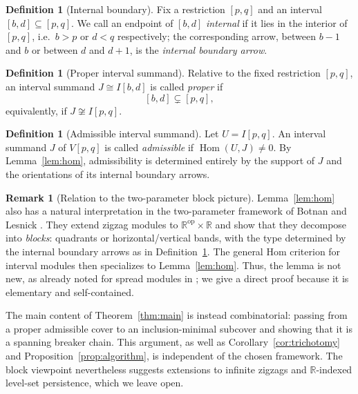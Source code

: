\documentclass[11pt]{amsart}
\numberwithin{equation}{section}
\theoremstyle{definition}
\newtheorem{definition}[theorem]{Definition}
\newtheorem{remark}[theorem]{Remark}
\begin{document}
\begin{definition}[Internal boundary]\label{def:internal}
Fix a restriction $[p,q]$ and an interval $[b,d] \subseteq [p,q]$. We call an
endpoint of $[b,d]$ \emph{internal} if it lies in the interior of $[p,q]$, i.e.\
$b > p$ or $d < q$ respectively; the corresponding arrow, between $b-1$ and $b$
or between $d$ and $d+1$, is the \emph{internal boundary arrow}.\end{definition}


\begin{definition}[Proper interval summand]\label{def:proper}
Relative to the fixed restriction $[p,q]$, an interval summand
$J\cong I[b,d]$ is called \emph{proper} if
\[
[b,d]\subsetneq[p,q],
\]
equivalently, if $J\not\cong I[p,q]$.
\end{definition}


\begin{definition}[Admissible interval summand]\label{def:admissible}
Let  $U=I[p,q]$.  An interval summand $J$ of $V[p,q]$ is called
\emph{admissible} if
\(
\operatorname{Hom}(U,J)\ne0.
\)
By Lemma~\ref{lem:hom}, admissibility is determined entirely by the support
of $J$ and the orientations of its internal boundary arrows.
\end{definition}
\begin{remark}[Relation to the two-parameter block picture]\label{rem:blocks}
Lemma~\ref{lem:hom} also has a natural interpretation in the two-parameter
framework of Botnan and Lesnick \cite{BotnanLesnick}. They extend zigzag
modules to $\mathbb{R}^{\mathrm{op}}\times\mathbb{R}$ and show that they
decompose into \emph{blocks}: quadrants or horizontal/vertical bands, with
the type determined by the internal boundary arrows as in
Definition~\ref{def:internal}. The general Hom criterion for interval
modules then specializes to Lemma~\ref{lem:hom}. Thus, the lemma is not new, as already noted for spread modules in \cite{BBH2,BBH};
we give a direct proof because it is elementary and self-contained.

The main content of Theorem~\ref{thm:main} is instead combinatorial: passing
from a proper admissible cover to an inclusion-minimal subcover and showing
that it is a spanning breaker chain. This argument, as well as
Corollary~\ref{cor:trichotomy} and Proposition~\ref{prop:algorithm}, is
independent of the chosen framework. The block viewpoint nevertheless
suggests extensions to infinite zigzags and $\mathbb{R}$-indexed level-set
persistence, which we leave open.
\end{remark}
\end{document}
